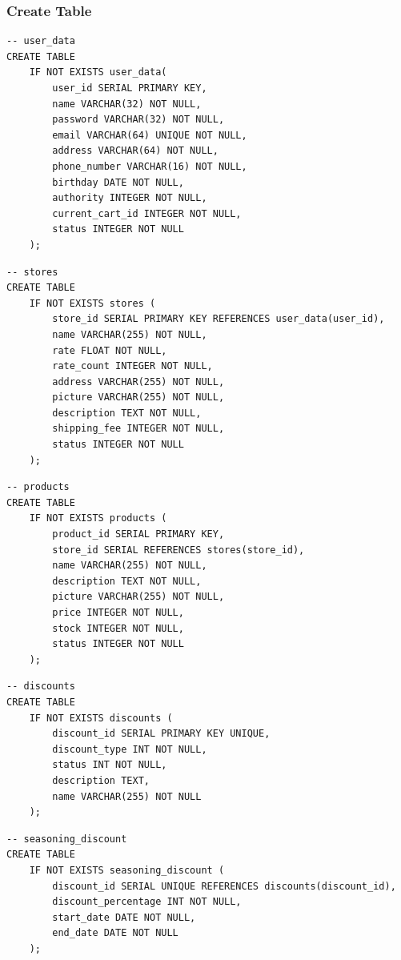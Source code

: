 \documentclass[a4paper, 12pt]{article}
\begin{document}
\subsubsection{Create Table}
\begin{lstlisting}
-- user_data
CREATE TABLE
    IF NOT EXISTS user_data(
        user_id SERIAL PRIMARY KEY,
        name VARCHAR(32) NOT NULL,
        password VARCHAR(32) NOT NULL,
        email VARCHAR(64) UNIQUE NOT NULL,
        address VARCHAR(64) NOT NULL,
        phone_number VARCHAR(16) NOT NULL,
        birthday DATE NOT NULL,
        authority INTEGER NOT NULL,
        current_cart_id INTEGER NOT NULL,
        status INTEGER NOT NULL
    );
\end{lstlisting}

\begin{lstlisting}
-- stores
CREATE TABLE
    IF NOT EXISTS stores (
        store_id SERIAL PRIMARY KEY REFERENCES user_data(user_id),
        name VARCHAR(255) NOT NULL,
        rate FLOAT NOT NULL,
        rate_count INTEGER NOT NULL,
        address VARCHAR(255) NOT NULL,
        picture VARCHAR(255) NOT NULL,
        description TEXT NOT NULL,
        shipping_fee INTEGER NOT NULL,
        status INTEGER NOT NULL
    );
\end{lstlisting}

\begin{lstlisting}
-- products
CREATE TABLE
    IF NOT EXISTS products (
        product_id SERIAL PRIMARY KEY,
        store_id SERIAL REFERENCES stores(store_id),
        name VARCHAR(255) NOT NULL,
        description TEXT NOT NULL,
        picture VARCHAR(255) NOT NULL,
        price INTEGER NOT NULL,
        stock INTEGER NOT NULL,
        status INTEGER NOT NULL
    );
\end{lstlisting}

\begin{lstlisting}
-- discounts
CREATE TABLE
    IF NOT EXISTS discounts (
        discount_id SERIAL PRIMARY KEY UNIQUE,
        discount_type INT NOT NULL,
        status INT NOT NULL,
        description TEXT,
        name VARCHAR(255) NOT NULL
    );
\end{lstlisting}

\begin{lstlisting}
-- seasoning_discount
CREATE TABLE
    IF NOT EXISTS seasoning_discount (
        discount_id SERIAL UNIQUE REFERENCES discounts(discount_id),
        discount_percentage INT NOT NULL,
        start_date DATE NOT NULL,
        end_date DATE NOT NULL
    );
\end{lstlisting}
\end{document}
